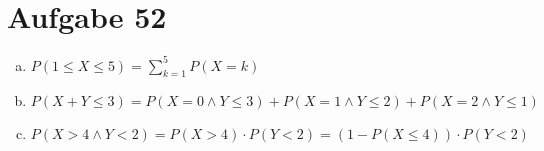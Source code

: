 \section{Aufgabe 52}
\setcounter{section}{52}

\begin{enumerate}[(a)]
    \item $P(1 \leq X \leq 5) = \sum_{k = 1}^5P(X = k)$
    \item $P(X + Y \leq 3) = P(X = 0 \land Y \leq 3) + P(X = 1 \land Y \leq 2) + P(X = 2 \land Y \leq 1)$
    \item $P(X > 4 \land Y < 2) = P(X > 4) \cdot P(Y < 2) = (1 - P(X \leq 4)) \cdot P(Y < 2)$
\end{enumerate}
